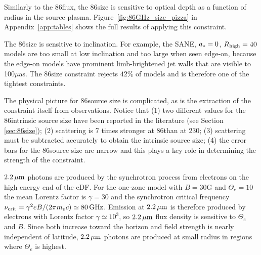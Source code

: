 
Similarly to the 86\GHz flux, the 86\GHz size is sensitive to optical depth as a function of radius in the source plasma.
Figure~\ref{fig:86GHz_size_pizza} in Appendix~\ref{app:tables} shows the full results of applying this constraint.

The 86\GHz size is sensitive to inclination.
For example, the SANE, $a_* = 0$, $R_\mathrm{high} = 40$ models are too small at low inclination and too large when seen edge-on, because the edge-on models have prominent limb-brightened jet walls that are visible to 100$\mu$as.
The 86\GHz size constraint rejects
$42\%$ of models and is therefore one of the tightest constraints.

The physical picture for 86\GHz source size is complicated, as is the extraction of the constraint itself from observations.
Notice that (1) two different values for the 86\GHz intrinsic source size have been reported in the literature (see Section \ref{sec:86size}); (2) scattering is $7$ times stronger at 86\GHz than at 230\GHz; (3) scattering must be subtracted accurately to obtain the intrinsic source size; (4) the error bars for the 86\GHz source size are narrow and this plays a key role in determining the strength of the constraint.


$2.2\,\mu\mathrm{m}$ photons are produced by the synchrotron process from electrons on the high energy end of the eDF.
For the one-zone model with $B = 30$G and $\Theta_e = 10$ the mean Lorentz factor is $\gamma = 30$ and the synchrotron critical frequency $\nu_\mathrm{crit} = \gamma^2 e B/(2 \pi m_e c) \simeq 80\,\mathrm{GHz}$.
Emission at $2.2\,\mu\mathrm{m}$ is therefore produced by electrons with  Lorentz factor $\gamma \simeq 10^3$, so $2.2\,\mu\mathrm{m}$ flux density is sensitive to $\Theta_e$ and $B$.
Since both increase toward the horizon and field strength is nearly independent of latitude, $2.2\,\mu\mathrm{m}$ photons are produced at small radius in regions where $\Theta_e$ is highest.

